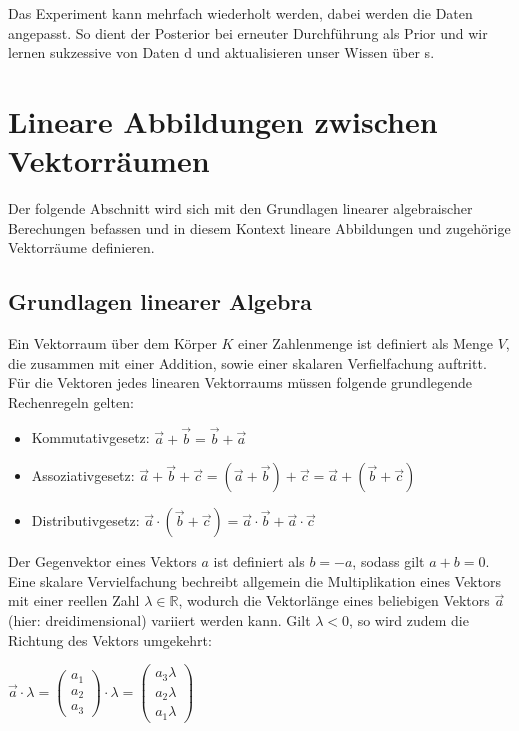 \documentclass[]{dsadokumentation}
\begin{document}
Das Experiment kann mehrfach wiederholt werden, dabei werden die Daten angepasst. So dient der Posterior bei erneuter Durchführung als Prior und wir lernen sukzessive von Daten d und aktualisieren unser Wissen über s.

\section{Lineare Abbildungen zwischen Vektorräumen}
Der folgende Abschnitt wird sich mit den Grundlagen linearer algebraischer Berechungen befassen und in diesem Kontext lineare Abbildungen und zugehörige Vektorräume definieren.

\subsection{Grundlagen linearer Algebra}
Ein Vektorraum über dem Körper $K$ einer Zahlenmenge ist definiert als Menge $V$, die zusammen mit einer Addition, sowie einer skalaren Verfielfachung auftritt. Für die Vektoren jedes linearen Vektorraums müssen folgende grundlegende Rechenregeln gelten:
\begin{itemize}
\item Kommutativgesetz: $\vec{a} + \vec{b} = \vec{b} + \vec{a}$
\item Assoziativgesetz: $\vec{a} + \vec{b} + \vec{c} = (\vec{a} +\vec{b}) + \vec{c} = \vec{a} + (\vec{b} +\vec{c})$
\item Distributivgesetz: $\vec{a} \cdot (\vec{b} + \vec{c}) = \vec{a} \cdot \vec{b} + \vec{a} \cdot \vec{c}$
\end{itemize}

Der Gegenvektor eines Vektors $a$ ist definiert als $b = -a$, sodass gilt $a + b = 0$. Eine skalare Vervielfachung bechreibt allgemein die Multiplikation eines Vektors mit einer reellen Zahl $\lambda \in \mathbb{R}$, wodurch die Vektorlänge eines beliebigen Vektors $\vec{a}$ (hier: dreidimensional) variiert werden kann. Gilt $\lambda < 0$, so wird zudem die Richtung des Vektors umgekehrt:
\begin{center} $\vec{a} \cdot \lambda = \left(\begin{array}{c} a_1 \\ a_2 \\ a_3 \end{array}\right)\cdot \lambda=\left(\begin{array}{c} a_3 \lambda \\ a_2 \lambda \\ a_1 \lambda \end{array}\right)$ \end{center}
\end{document}
